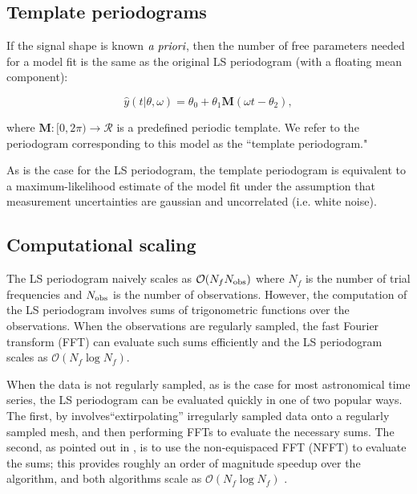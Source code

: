 \documentclass[apj]{emulateapj}
\newcommand{\bigO}{\mathcal{O}}
\begin{document}
\subsection{Template periodograms}

If the signal shape is known $\emph{a priori}$, then the number of free parameters needed for
a model fit is the same as the original LS periodogram (with a floating mean component):

\begin{equation}
    \hat{y}(t|\theta, \omega) = \theta_0 + \theta_1 \mathbf{M}(\omega t - \theta_2),
\end{equation}

where $\mathbf{M}:[0, 2\pi)\rightarrow \mathcal{R}$ is a predefined periodic template. 
We refer to the periodogram corresponding to this model as the ``template periodogram."

As is the case for the LS periodogram, the template periodogram 
is equivalent to a maximum-likelihood estimate of the model fit under the assumption that
measurement uncertainties are gaussian and uncorrelated (i.e. white noise).

\subsection{Computational scaling}

The LS periodogram naively scales as $\bigO(N_f N_{\rm obs})$ where $N_f$ is the number of trial
frequencies and $N_{\rm obs}$ is the number of observations. However, the computation
of the LS periodogram involves sums of trigonometric functions over the observations. When
the observations are regularly sampled, the fast Fourier transform (FFT)  \citep{Cooley+Tukey_1965} 
can evaluate such sums efficiently and the LS periodogram scales as $\bigO(N_f\log N_f)$.

When the data is not regularly sampled, as is the case for most astronomical time series,
the LS periodogram can be evaluated quickly in one of two popular ways. 
The first, by \cite{Press+Rybicki_1989} involves``extirpolating'' irregularly sampled 
data onto a regularly sampled mesh, and then performing FFTs to evaluate the necessary sums.
The second, as pointed out in \cite{Leroy_2012}, is to use the non-equispaced FFT (NFFT) \cite{NFFT} 
to evaluate the sums; this provides roughly an order of magnitude speedup over the \cite{Press+Rybicki_1989}
algorithm, and both algorithms scale as $\bigO(N_f\log N_f)$ \citep{Leroy_2012}.
\end{document}
